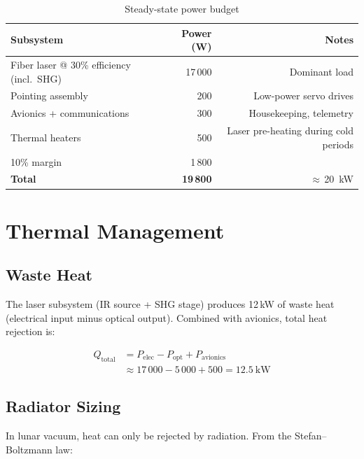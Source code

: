 \documentclass[10pt,letterpaper]{article}
\begin{document}
\begin{table}[!ht]
\centering\small
\caption{Steady-state power budget}
\label{tab:power-budget}
\begin{tabularx}{\linewidth}{Xrr}
\toprule
\textbf{Subsystem} & \textbf{Power (W)} & \textbf{Notes} \\
\midrule
Fiber laser @ 30\% efficiency (incl.\ SHG) & 17\,000 & Dominant load \\
Pointing assembly & 200 & Low-power servo drives \\
Avionics + communications & 300 & Housekeeping, telemetry \\
Thermal heaters & 500 & Laser pre-heating during cold periods \\
10\% margin & 1\,800 & \\
\midrule
\textbf{Total} & \textbf{19\,800} & $\approx$\,\SI{20}{\kilo\watt} \\
\bottomrule
\end{tabularx}
\end{table}

\section{Thermal Management}

\subsection{Waste Heat}

The laser subsystem (IR source + SHG stage) produces 12\,kW of waste heat
(electrical input minus optical output). Combined with avionics, total heat
rejection is:

\begin{align*}
  Q_{\text{total}} &= P_{\text{elec}} - P_{\text{opt}} + P_{\text{avionics}} \\
                   &\approx 17\,000 - 5\,000 + 500 = \SI{12.5}{\kilo\watt}
\end{align*}

\subsection{Radiator Sizing}

In lunar vacuum, heat can only be rejected by radiation. From the
Stefan--Boltzmann law:
\end{document}
